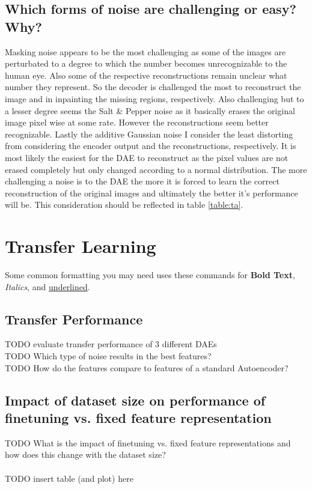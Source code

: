 \documentclass[10pt, a4paper]{article}
\begin{document}
    \subsection{Which forms of noise are challenging or easy? Why?}
    Masking noise appears to be the most challenging as some of the images are perturbated to a degree to which the number becomes unrecognizable to the human eye. Also some of the respective reconstructions remain unclear what number they represent. So the decoder is challenged the most to reconstruct the image and in inpainting the missing regions, respectively.\newline
    Also challenging but to a lesser degree seems the Salt \& Pepper noise as it basically erases the original image pixel wise at some rate. However the reconstructions seem better recognizable. Lastly the additive Gaussian noise I consider the least distorting from considering the encoder output and the reconstructions, respectively. It is most likely the easiest for the DAE to reconstruct as the pixel values are not erased completely but only changed according to a normal distribution.\newline
    The more challenging a noise is to the DAE the more it is forced to learn the correct reconstruction of the original images and ultimately the better it's performance will be. This consideration should be reflected in table \ref{table:ta}.
    
	
	\section{Transfer Learning}
	Some common formatting you may need uses these commands for \textbf{Bold Text}, \textit{Italics}, and \underline{underlined}.
	
	\subsection{Transfer Performance}
    TODO evaluate transfer performance of 3 different DAEs\\
    TODO Which type of noise results in the best features?\\
    TODO How do the features compare to features of a standard Autoencoder?
    
    \subsection{Impact of dataset size on performance of finetuning vs. fixed feature representation}
    TODO What is the impact of finetuning vs. fixed feature representations and how does this change with the dataset size?\\
	\\
	TODO insert table (and plot) here
    
\end{document}
